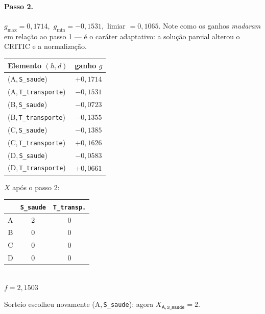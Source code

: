 \documentclass[11pt,a4paper]{article}
\newcommand{\hex}[1]{\textsf{#1}}
\begin{document}
\paragraph{Passo 2.}
$g_{\max}=0{,}1714$,\ $g_{\min}=-0{,}1531$,\ limiar $=0{,}1065$.
Note como os ganhos \emph{mudaram} em relação ao passo 1 --- é o caráter
adaptativo: a solução parcial alterou o CRITIC e a normalização.

\begin{minipage}[t]{0.55\textwidth}
\centering
\small
\begin{tabular}{@{}lc@{}}
\toprule
Elemento $(h,d)$ & ganho $g$ \\
\midrule
\rowcolor{cellsel}(\hex{A},\,\texttt{S\_saude})      & $+0{,}1714$ \\
(\hex{A},\,\texttt{T\_transporte})                   & $-0{,}1531$ \\
(\hex{B},\,\texttt{S\_saude})                        & $-0{,}0723$ \\
(\hex{B},\,\texttt{T\_transporte})                   & $-0{,}1355$ \\
(\hex{C},\,\texttt{S\_saude})                        & $-0{,}1385$ \\
\rowcolor{cellrcl}(\hex{C},\,\texttt{T\_transporte}) & $+0{,}1626$ \\
(\hex{D},\,\texttt{S\_saude})                        & $-0{,}0583$ \\
(\hex{D},\,\texttt{T\_transporte})                   & $+0{,}0661$ \\
\bottomrule
\end{tabular}
\end{minipage}
\hfill
\begin{minipage}[t]{0.40\textwidth}
\centering
\small
\vspace{2pt}
$X$ após o passo 2:\\[4pt]
\begin{tabular}{@{}c cc@{}}
\toprule
 & \texttt{S\_saude} & \texttt{T\_transp.} \\
\midrule
\hex{A} & \cellcolor{cellchg}2 & 0 \\
\hex{B} & 0 & 0 \\
\hex{C} & 0 & 0 \\
\hex{D} & 0 & 0 \\
\bottomrule
\end{tabular}\\[4pt]
$f = 2{,}1503$
\end{minipage}

\medskip
Sorteio escolheu novamente (\hex{A},\,\texttt{S\_saude}): agora $X_{\hex{A},\,\texttt{S\_saude}}=2$.
\end{document}
